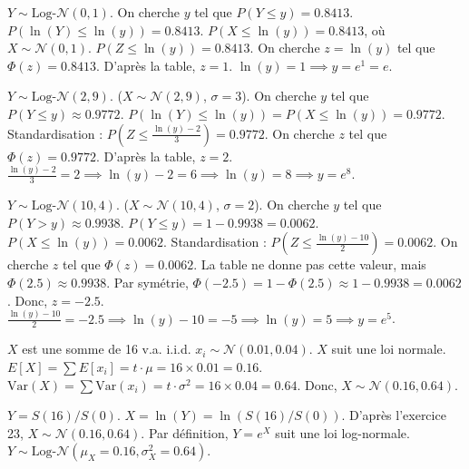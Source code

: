 \begin{correctionbox}
$Y \sim \text{Log-}\mathcal{N}(0, 1)$. On cherche $y$ tel que $P(Y \le y) = 0.8413$.
$P(\ln(Y) \le \ln(y)) = 0.8413$.
$P(X \le \ln(y)) = 0.8413$, où $X \sim \mathcal{N}(0, 1)$.
$P(Z \le \ln(y)) = 0.8413$.
On cherche $z = \ln(y)$ tel que $\Phi(z) = 0.8413$. D'après la table, $z=1$.
$\ln(y) = 1 \implies y = e^1 = e$.
\end{correctionbox}

\begin{correctionbox}
$Y \sim \text{Log-}\mathcal{N}(2, 9)$. ($X \sim \mathcal{N}(2, 9)$, $\sigma=3$).
On cherche $y$ tel que $P(Y \le y) \approx 0.9772$.
$P(\ln(Y) \le \ln(y)) = P(X \le \ln(y)) = 0.9772$.
Standardisation : $P\left(Z \le \frac{\ln(y) - 2}{3}\right) = 0.9772$.
On cherche $z$ tel que $\Phi(z) = 0.9772$. D'après la table, $z=2$.
$\frac{\ln(y) - 2}{3} = 2 \implies \ln(y) - 2 = 6 \implies \ln(y) = 8 \implies y = e^8$.
\end{correctionbox}

\begin{correctionbox}
$Y \sim \text{Log-}\mathcal{N}(10, 4)$. ($X \sim \mathcal{N}(10, 4)$, $\sigma=2$).
On cherche $y$ tel que $P(Y > y) \approx 0.9938$.
$P(Y \le y) = 1 - 0.9938 = 0.0062$.
$P(X \le \ln(y)) = 0.0062$.
Standardisation : $P\left(Z \le \frac{\ln(y) - 10}{2}\right) = 0.0062$.
On cherche $z$ tel que $\Phi(z) = 0.0062$.
La table ne donne pas cette valeur, mais $\Phi(2.5) \approx 0.9938$.
Par symétrie, $\Phi(-2.5) = 1 - \Phi(2.5) \approx 1 - 0.9938 = 0.0062$.
Donc, $z = -2.5$.
$\frac{\ln(y) - 10}{2} = -2.5 \implies \ln(y) - 10 = -5 \implies \ln(y) = 5 \implies y = e^5$.
\end{correctionbox}

\begin{correctionbox}
$X$ est une somme de 16 v.a. i.i.d. $x_i \sim \mathcal{N}(0.01, 0.04)$.
$X$ suit une loi normale.
$E[X] = \sum E[x_i] = t \cdot \mu = 16 \times 0.01 = 0.16$.
$\text{Var}(X) = \sum \text{Var}(x_i) = t \cdot \sigma^2 = 16 \times 0.04 = 0.64$.
Donc, $X \sim \mathcal{N}(0.16, 0.64)$.
\end{correctionbox}

\begin{correctionbox}
$Y = S(16)/S(0)$. $X = \ln(Y) = \ln(S(16)/S(0))$.
D'après l'exercice 23, $X \sim \mathcal{N}(0.16, 0.64)$.
Par définition, $Y = e^X$ suit une loi log-normale.
$Y \sim \text{Log-}\mathcal{N}(\mu_X=0.16, \sigma_X^2=0.64)$.
\end{correctionbox}

